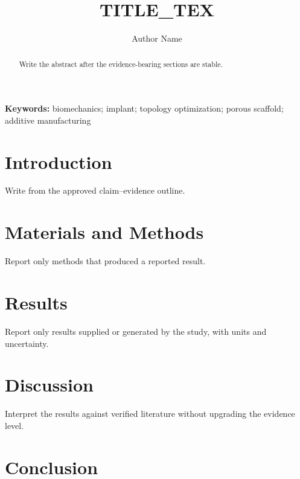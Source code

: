 \documentclass[11pt]{article}
\title{ {{TITLE_TEX}} }
\author{Author Name}
\date{}
\begin{document}
\maketitle

\begin{abstract}
Write the abstract after the evidence-bearing sections are stable.
\end{abstract}

\textbf{Keywords:} biomechanics; implant; topology optimization; porous scaffold; additive manufacturing

\section{Introduction}

Write from the approved claim--evidence outline.

\section{Materials and Methods}

Report only methods that produced a reported result.

\section{Results}

Report only results supplied or generated by the study, with units and uncertainty.

\section{Discussion}

Interpret the results against verified literature without upgrading the evidence level.

\section{Conclusion}
\end{document}
